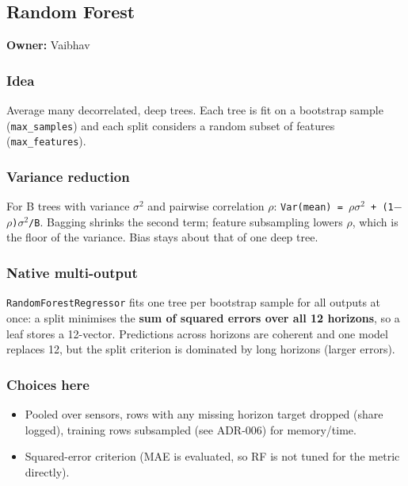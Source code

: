\documentclass[10pt,a4paper]{article}
\begin{document}
\subsection*{Random Forest}
\textbf{Owner:} Vaibhav

\subsubsection*{Idea}
Average many decorrelated, deep trees. Each tree is fit on a bootstrap sample (\texttt{max\_\allowbreak{}samples}) and each split considers a random subset of features (\texttt{max\_\allowbreak{}features}).

\subsubsection*{Variance reduction}
For B trees with variance \ensuremath{\sigma}\ensuremath{^{2}} and pairwise correlation \ensuremath{\rho}: \texttt{Var(mean) = \ensuremath{\rho}\ensuremath{\sigma}\ensuremath{^{2}} + (1\ensuremath{-}\ensuremath{\rho})\ensuremath{\sigma}\ensuremath{^{2}}/\allowbreak{}B}. Bagging shrinks the second term; feature subsampling lowers \ensuremath{\rho}, which is the floor of the variance. Bias stays about that of one deep tree.

\subsubsection*{Native multi-output}
\texttt{RandomForestRegressor} fits one tree per bootstrap sample for all outputs at once: a split minimises the \textbf{sum of squared errors over all 12 horizons}, so a leaf stores a 12-vector. Predictions across horizons are coherent and one model replaces 12, but the split criterion is dominated by long horizons (larger errors).

\subsubsection*{Choices here}
\begin{itemize}[nosep,leftmargin=*]
\item Pooled over sensors, rows with any missing horizon target dropped (share logged), training rows subsampled (see ADR-006) for memory/\allowbreak{}time.
\item Squared-error criterion (MAE is evaluated, so RF is not tuned for the metric directly).
\end{itemize}
\end{document}
